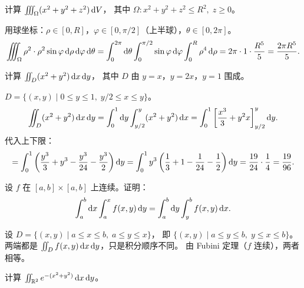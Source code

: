 \documentclass{ctexart}
\begin{document}
\begin{exercise}[球坐标]
  计算 $\iiint_\Omega (x^2+y^2+z^2) \,\mathrm{d} V$，
  其中 $\Omega: x^2+y^2+z^2 \le R^2,\; z \ge 0$。
\end{exercise}

\begin{solution}
  用球坐标：$\rho \in [0, R]$，$\varphi \in [0, \pi/2]$（上半球），$\theta \in [0, 2\pi]$。
  \[
    \iiint_\Omega \rho^2 \cdot \rho^2 \sin\varphi \,\mathrm{d} \rho\,\mathrm{d} \varphi\,\mathrm{d} \theta
    = \int_0^{2\pi} \mathrm{d} \theta \int_0^{\pi/2} \sin\varphi \,\mathrm{d} \varphi \int_0^R \rho^4 \,\mathrm{d} \rho
    = 2\pi \cdot 1 \cdot \frac{R^5}{5}
    = \frac{2\pi R^5}{5}.
  \]
\end{solution}

\begin{exercise}
  计算
  $\iint_D (x^2 + y^2) \,\mathrm{d} x\,\mathrm{d} y$，
  其中 $D$ 由 $y = x$，$y = 2x$，$y = 1$ 围成。
\end{exercise}

\begin{solution}
  $D = \{(x,y) \mid 0 \le y \le 1,\; y/2 \le x \le y\}$。
  \[
    \iint_D (x^2+y^2) \,\mathrm{d} x\,\mathrm{d} y
    = \int_0^1 \mathrm{d} y \int_{y/2}^y (x^2+y^2) \,\mathrm{d} x
    = \int_0^1 \left[ \frac{x^3}{3} + y^2 x \right]_{y/2}^y \mathrm{d} y.
  \]
  代入上下限：
  \[
    = \int_0^1 \left( \frac{y^3}{3} + y^3 - \frac{y^3}{24} - \frac{y^3}{2} \right) \mathrm{d} y
    = \int_0^1 y^3 \left( \frac{1}{3} + 1 - \frac{1}{24} - \frac{1}{2} \right) \mathrm{d} y
    = \frac{19}{24} \cdot \frac{1}{4}
    = \frac{19}{96}.
  \]
\end{solution}

\begin{exercise}
  设 $f$ 在 $[a,b] \times [a,b]$ 上连续。证明：
  \[
    \int_a^b \mathrm{d} x \int_a^x f(x,y) \,\mathrm{d} y
    = \int_a^b \mathrm{d} y \int_y^b f(x,y) \,\mathrm{d} x.
  \]
\end{exercise}

\begin{solution}
  设 $D = \{(x,y) \mid a \le x \le b,\; a \le y \le x\}$，
  即 $\{(x,y) \mid a \le y \le b,\; y \le x \le b\}$。
  两端都是 $\iint_D f(x,y) \,\mathrm{d} x\,\mathrm{d} y$，只是积分顺序不同。
  由 Fubini 定理（$f$ 连续），两者相等。
\end{solution}

\begin{exercise}
  计算 $\iint_{\mathbb{R}^2} e^{-(x^2+y^2)} \,\mathrm{d} x\,\mathrm{d} y$。
\end{exercise}
\end{document}
